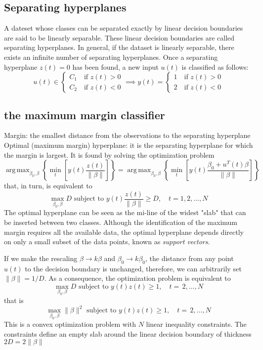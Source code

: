 \documentclass{book}
\DeclareMathOperator*{\argmax}{arg\,max}
\begin{document}
\subsection{Separating hyperplanes}
A dateset whose classes can be separated exactly by linear decision boundaries are said to be linearly separable. These linear decision boundaries are called separating hyperplanes. In general, if the dataset is linearly separable, there exists an infinite number of separating hyperplanes. Once a separating hyperplane $z(t)=0$ has been found, a new input $u(t)$ is classified as follows:
\[
    u(t) \in \begin{cases}
        C_1 \quad \text{if } z(t)>0\\
        C_2 \quad \text{if } z(t)<0
    \end{cases} \implies y(t) = \begin{cases}
    1 \quad \text{if } z(t)>0\\
    2 \quad \text{if } z(t)<0
   \end{cases}
\]
\subsection{the maximum margin classifier}
Margin: the smallest distance from the observations to the separating hyperplane\\
Optimal (maximum margin) hyperplane: it is the separating hyperplane for which the margin is largest.
It is found by solving the optimization problem
\[
    \argmax_{\beta_0,\beta}\left\{\min_t\left[y(t)\displaystyle\frac{z(t)}{\|\beta\|} \right] \right\}  = \argmax_{\beta_0,\beta}\left\{\min_t\left[y(t)\displaystyle\frac{\beta_0+u^T(t)\beta}{\|\beta\|} \right] \right\}
\]
that, in turn, is equivalent to 
\[
    \max_{\beta_0,\beta}D \text{ subject to } y(t)\displaystyle\frac{z(t)}{\|\beta\|}\geq D, \quad t=1,2,\dots,N
\]
The optimal hyperplane can be seen as the mi-line of the widest "slab" that can be inserted between two classes. Although the identification of the maximum margin requires all the available data, the optimal hyperplane depends directly on only a small subset of the data points, known as \emph{support vectors}. 

If we make the rescaling $\beta\to k\beta$ and $\beta_0 \to k\beta_0$, the distance from any point $u(t)$ to the decision boundary is unchanged, therefore, we can arbitrarily set $\|\beta\|=1/D$. As a consequence, the optimization problem is equivalent to 
\[
    \max_{\beta_0,\beta}D \text{ subject to } y(t)z(t)\geq 1, \quad t = \,2,\dots,N
\]
that is
\[
    \max_{\beta_0,\beta}\|\beta\|^2 \text{ subject to } y(t)z(t)\geq 1, \quad t = \,2,\dots,N
\]
This is a convex optimization problem with $N$ linear inequality constraints. The constraints define an empty slab around the linear decision boundary of thickness $2D=2\|\beta\|$ 
\end{document}
